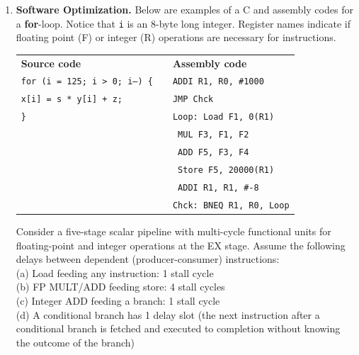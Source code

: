 \documentclass[a4paper, 11pt]{exam}
\begin{document}
\begin{center}
{{{\begin{enumerate}
\begin{enumerate}
\end{enumerate}


\item \textbf {Software Optimization.}
Below are examples of a C and assembly codes for a \textbf{for}-loop.
Notice that \texttt{i} is an 8-byte long integer. Register names indicate if floating point (F) or integer (R) operations are necessary for instructions.

\begin{tabular}{lll}
	\textbf{Source code} & & \textbf{Assembly code }\\
	\texttt{for (i = 125; i > 0; i--) \{}&  &\hspace{40pt}\texttt{ADDI R1, R0, \#1000} \\
	\hspace{20pt}\texttt{x[i] = s * y[i] + z;} &  &\hspace{40pt}\texttt{JMP Chck}\\
	\texttt{\}} &  &\texttt{Loop: Load F1, 0(R1)} \\
    &  &\hspace{35pt}\texttt{ MUL F3, F1, F2}\\
	&  &\hspace{35pt}\texttt{ ADD F5, F3, F4}\\
	&  &\hspace{35pt}\texttt{ Store F5, 20000(R1)}\\
	&  &\hspace{35pt}\texttt{ ADDI R1, R1, \#-8}\\
	&  &\texttt{Chck: BNEQ R1, R0, Loop}\\
\end{tabular}

Consider a five-stage scalar pipeline with multi-cycle functional units for floating-point and integer operations at the EX stage.
Assume the following delays between dependent (producer-consumer) instructions:\\
(a) Load feeding any instruction: 1 stall cycle\\
(b) FP MULT/ADD feeding store: 4 stall cycles\\
(c) Integer ADD feeding a branch: 1 stall cycle\\
(d) A conditional branch has 1 delay slot (the next instruction after a conditional branch is fetched and executed to completion without knowing the outcome of the branch)


\end{enumerate}}}}
\end{center}
\end{document}
